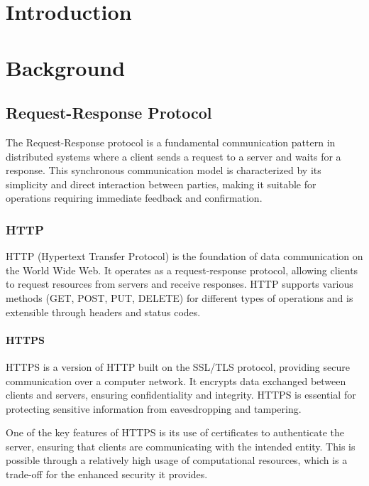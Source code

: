 \documentclass[12pt,a4paper,twoside]{book}
\begin{document}
\chapter{Introduction} \label{chap:intro}
\pagestyle{plain}
\setcounter{page}{1}




\chapter{Background}
\section{Request-Response Protocol}
The Request-Response protocol is a fundamental communication pattern in distributed systems where a client sends a request to a server and waits for a response. This synchronous communication model is characterized by its simplicity and direct interaction between parties, making it suitable for operations requiring immediate feedback and confirmation.

\subsection{HTTP}
HTTP (Hypertext Transfer Protocol) is the foundation of data communication on the World Wide Web. It operates as a request-response protocol, allowing clients to request resources from servers and receive responses. HTTP supports various methods (GET, POST, PUT, DELETE) for different types of operations and is extensible through headers and status codes.

\subsubsection{HTTPS}
HTTPS is a version of HTTP built on the SSL/TLS protocol, providing secure communication over a computer network. It encrypts data exchanged between clients and servers, ensuring confidentiality and integrity. HTTPS is essential for protecting sensitive information from eavesdropping and tampering.

One of the key features of HTTPS is its use of certificates to authenticate the server, ensuring that clients are communicating with the intended entity. This is possible through a relatively high usage of computational resources, which is a trade-off for the enhanced security it provides.
\end{document}
